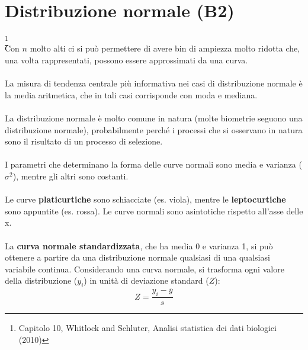 \documentclass[drafts, 10pt]{book}
\begin{document}
\chapter{Distribuzione normale (B2)} \footnote{Capitolo 10, Whitlock and Schluter, Analisi statistica dei dati biologici (2010)}
\\
Con $n$ molto alti ci si può permettere di avere bin di ampiezza molto ridotta che, una volta rappresentati, possono essere approssimati da una curva.
\\
\\
La misura di tendenza centrale più informativa nei casi di distribuzione normale è la media aritmetica, che in tali casi corrisponde con moda e mediana.
\\
\\
La distribuzione normale è molto comune in natura (molte biometrie seguono una distribuzione normale), probabilmente perché i processi che si osservano in natura sono il risultato di un processo di selezione.
\\
\\
I parametri che determinano la forma delle curve normali sono media e varianza ($\sigma^2$), mentre gli altri sono costanti.
\\
\\
Le curve \textbf{platicurtiche} sono schiacciate (es. viola), mentre le  \textbf{leptocurtiche} sono appuntite (es. rossa).
Le curve normali sono asintotiche rispetto all’asse delle x.
\\
\\
La \textbf{curva normale standardizzata}, che ha media 0 e varianza 1, si può ottenere a partire da una distribuzione normale qualsiasi di una qualsiasi variabile continua. Considerando una curva normale, si trasforma ogni valore della distribuzione ($y_i$) in unità di deviazione standard ($Z$):
\begin{equation}
    Z = \frac{y_i - \overline{y}}{s}
\end{equation}
\end{document}
